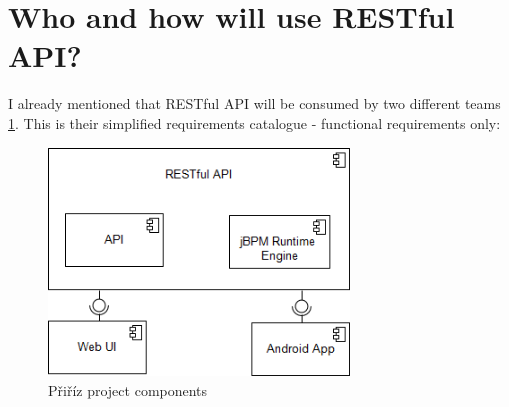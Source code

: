 	\section{Who and how will use RESTful API?}
	
	I already mentioned that RESTful API will be consumed by two different teams \ref{fig:pririz_project_component}. This
	is their simplified requirements catalogue - functional requirements only:
	
	\begin{figure}[h]
	  	\centering
	  	\label{fig:pririz_project_component}
	    \includegraphics[width=8cm]{figures/pririz_project_component}
	  	\caption{Přiříz project components}
	\end{figure} 
	
